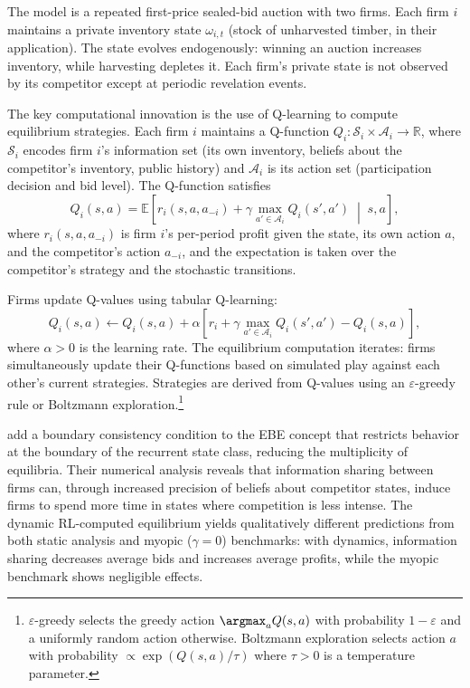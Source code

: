 The model is a repeated first-price sealed-bid auction with two firms. Each firm $i$ maintains a private inventory state $\omega_{i,t}$ (stock of unharvested timber, in their application). The state evolves endogenously: winning an auction increases inventory, while harvesting depletes it. Each firm's private state is not observed by its competitor except at periodic revelation events.

The key computational innovation is the use of Q-learning to compute equilibrium strategies. Each firm $i$ maintains a Q-function $Q_i: \mathcal{S}_i \times \mathcal{A}_i \to \mathbb{R}$, where $\mathcal{S}_i$ encodes firm $i$'s information set (its own inventory, beliefs about the competitor's inventory, public history) and $\mathcal{A}_i$ is its action set (participation decision and bid level). The Q-function satisfies
\begin{equation}
Q_i(s, a) = \mathbb{E}\left[r_i(s, a, a_{-i}) + \gamma \max_{a' \in \mathcal{A}_i} Q_i(s', a') \;\middle|\; s, a\right], \label{eq:asker_bellman}
\end{equation}
where $r_i(s, a, a_{-i})$ is firm $i$'s per-period profit given the state, its own action $a$, and the competitor's action $a_{-i}$, and the expectation is taken over the competitor's strategy and the stochastic transitions.

Firms update Q-values using tabular Q-learning:
\begin{equation}
Q_i(s, a) \leftarrow Q_i(s, a) + \alpha\left[r_i + \gamma \max_{a' \in \mathcal{A}_i} Q_i(s', a') - Q_i(s, a)\right], \label{eq:asker_qupdate}
\end{equation}
where $\alpha > 0$ is the learning rate. The equilibrium computation iterates: firms simultaneously update their Q-functions based on simulated play against each other's current strategies. Strategies are derived from Q-values using an $\varepsilon$-greedy rule or Boltzmann exploration.\footnote{$\varepsilon$-greedy selects the greedy action $\argmax_a Q(s,a)$ with probability $1-\varepsilon$ and a uniformly random action otherwise. Boltzmann exploration selects action $a$ with probability $\propto \exp(Q(s,a)/\tau)$ where $\tau > 0$ is a temperature parameter.}

\citet{AskerEtAl2020} add a boundary consistency condition to the EBE concept that restricts behavior at the boundary of the recurrent state class, reducing the multiplicity of equilibria. Their numerical analysis reveals that information sharing between firms can, through increased precision of beliefs about competitor states, induce firms to spend more time in states where competition is less intense. The dynamic RL-computed equilibrium yields qualitatively different predictions from both static analysis and myopic ($\gamma = 0$) benchmarks: with dynamics, information sharing decreases average bids and increases average profits, while the myopic benchmark shows negligible effects.


